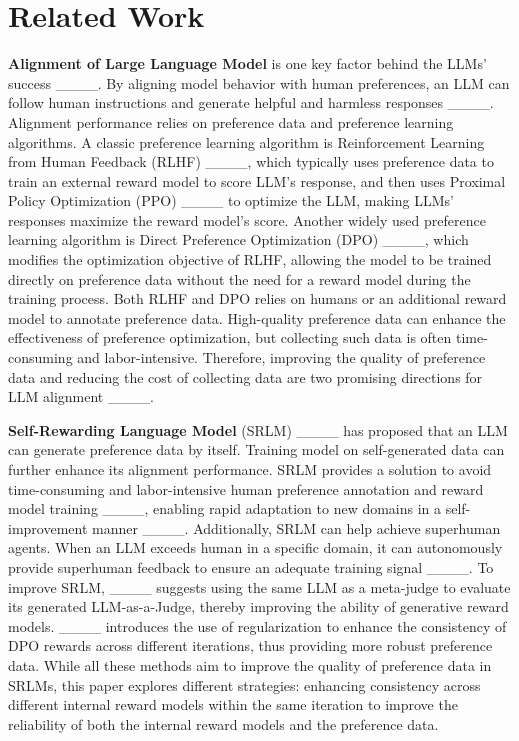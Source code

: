 \section{Related Work}
\textbf{Alignment of Large Language Model} is one key factor behind the LLMs' success ____. 
By aligning model behavior with human preferences, an LLM can follow human instructions and generate helpful and harmless responses ____.  
Alignment performance relies on preference data and preference learning algorithms. 
A classic preference learning algorithm is Reinforcement Learning from Human Feedback (RLHF) ____, which typically uses preference data to train an external reward model to score LLM's response, and then uses Proximal Policy Optimization (PPO) ____ to optimize the LLM, making LLMs' responses maximize the reward model’s score. 
Another widely used preference learning algorithm is Direct Preference Optimization (DPO) ____, which modifies the optimization objective of RLHF, allowing the model to be trained directly on preference data without the need for a reward model during the training process. 
Both RLHF and DPO relies on humans or an additional reward model to annotate preference data. 
High-quality preference data can enhance the effectiveness of preference optimization, but collecting such data is often time-consuming and labor-intensive. 
Therefore, improving the quality of preference data and reducing the cost of collecting data are two promising directions for LLM alignment ____.


\textbf{Self-Rewarding Language Model} (SRLM) ____ has proposed that an LLM can generate preference data by itself. Training model on self-generated data can further enhance its alignment performance. 
SRLM provides a solution to avoid time-consuming and labor-intensive human preference annotation and reward model training ____, enabling rapid adaptation to new domains in a self-improvement manner ____. 
Additionally, SRLM can help achieve superhuman agents. When an LLM exceeds human in a specific domain, it can autonomously provide superhuman feedback to ensure an adequate training signal ____. 
To improve SRLM, ____ 
suggests using the same LLM as a meta-judge to evaluate its generated LLM-as-a-Judge, thereby improving the ability of generative reward models. ____ introduces the use of regularization to enhance the consistency of DPO rewards across different iterations, thus providing more robust preference data. 
While all these methods aim to improve the quality of preference data in SRLMs, this paper explores different strategies: enhancing consistency across different internal reward models within the same iteration to improve the reliability of both the internal reward models and the preference data.